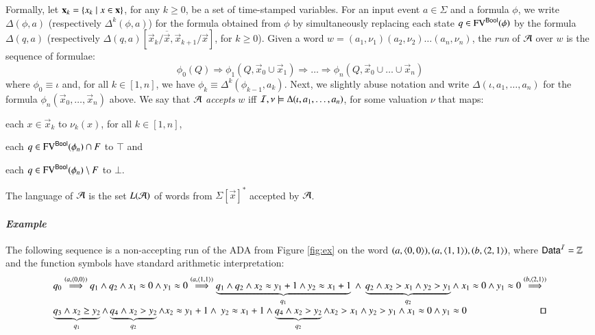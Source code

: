 \documentclass[10pt]{llncs}
\begin{document}
Formally, let $\mathbf x_k = \left\{ x_k \mid x \in \mathbf x \right\}$, for any
$k\geq0$, be a set of time-stamped variables. For an input event $a
\in \Sigma$ and a formula $\phi$, we write $\Delta(\phi,a)$
(respectively $\Delta^k(\phi,a)$) for the formula obtained from $\phi$
by simultaneously replacing each state $q \in \mathrm{FV}^{\mathsf{Bool}}(\phi)$ by the
formula $\Delta(q,a)$ (respectively
$\Delta(q,a)[\vec{x}_k/\overline{\vec{x}},\vec{x}_{k+1}/\vec{x}]$, for
$k\geq0$). Given a word $w = (a_1,\nu_1)(a_2,\nu_2) \ldots
(a_n,\nu_n)$, the \emph{run} of $\mathcal{A}$ over $w$ is the sequence of
formulae: \[\phi_0(Q) \Rightarrow \phi_1(Q,\vec{x}_0 \cup \vec{x}_1)
\Rightarrow \ldots \Rightarrow \phi_n(Q,\vec{x}_0 \cup \ldots \cup
\vec{x}_n)\] where $\phi_0 \equiv \iota$ and, for all $k\in[1,n]$, we
have $\phi_k \equiv \Delta^k(\phi_{k-1},a_k)$. Next, we slightly abuse
notation and write $\Delta(\iota,a_1,\ldots,a_n)$ for the formula
$\phi_n(\vec{x}_0,\ldots,\vec{x}_n)$ above. We say that $\mathcal{A}$
\emph{accepts} $w$ iff $\mathcal{I},\nu \models \Delta(\iota,a_1,\ldots,a_n)$,
for some valuation $\nu$ that maps:\begin{inparaenum}[(1)]
%
\item each $x \in \vec{x}_k$ to $\nu_k(x)$, for all $k\in[1,n]$, 
%
\item each $q \in \mathrm{FV}^{\mathsf{Bool}}(\phi_n) \cap F$ to $\top$ and 
%
\item each $q \in \mathrm{FV}^{\mathsf{Bool}}(\phi_n) \setminus F$ to $\bot$.
\end{inparaenum}
The language of $\mathcal{A}$ is the set $L(\mathcal{A})$ of words from
$\Sigma[\vec{x}]^*$ accepted by $\mathcal{A}$.


\paragraph{\em Example} 
The following sequence is a non-accepting run of the ADA from Figure
\ref{fig:ex} on the word
$(a,\left\langle 0,0 \right\rangle),(a,\left\langle 1,1 \right\rangle),(b,\left\langle 2,1 \right\rangle)$, where $\mathsf{Data}^{\mathcal{I}} =
{\bf \mathbb{Z}}$ and the function symbols have standard arithmetic
interpretation:
{\scriptsize\[\begin{array}{l}
q_0 \stackrel{(a,\tuple{0,0})}{\Longrightarrow} 
q_1 \wedge q_2 \wedge x_1\teq0 \wedge y_1\teq0 \stackrel{(a,\tuple{1,1})}{\Longrightarrow} 
\underbrace{q_1 \wedge q_2 \wedge x_2\teq y_1+1 \wedge y_2\teq x_1+1}_{q_1} ~\wedge~
\underbrace{q_2 \wedge x_2>x_1 \wedge y_2>y_1}_{q_2} 
\wedge~ x_1\teq0 \wedge y_1\teq0 \stackrel{(b,\tuple{2,1})}{\Longrightarrow} \\
\underbrace{q_3 \wedge x_2\geq y_2}_{q_1} \wedge \underbrace{q_4 \wedge x_2>y_2}_{q_2} \wedge x_2\teq y_1+1 
\wedge~ y_2\teq x_1+1 \wedge \underbrace{q_4 \wedge x_2>y_2}_{q_2} \wedge x_2>x_1 \wedge y_2>y_1 \wedge x_1\teq0 \wedge y_1\teq0 ~\hfill\text{\qed}\end{array}\]}
\end{document}
